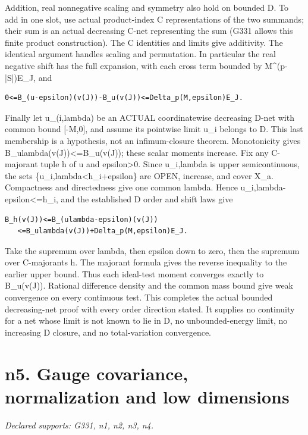 \documentclass[11pt]{article}
\begin{document}
Addition, real nonnegative scaling and symmetry also hold on bounded D. To add in one slot, use actual product-index C representations of the two summands; their sum is an actual decreasing C-net representing the sum (G331 allows this finite product construction). The C identities and limits give additivity. The identical argument handles scaling and permutation. In particular the real negative shift has the full expansion, with each cross term bounded by M\textasciicircum{}(p-|S|)E\_J, and

\begin{Verbatim}[fontsize=\small,breaklines=true,breakanywhere=true]
0<=B_(u-epsilon)(v(J))-B_u(v(J))<=Delta_p(M,epsilon)E_J.
\end{Verbatim}

Finally let u\_(i,lambda) be an ACTUAL coordinatewise decreasing D-net with common bound [-M,0], and assume its pointwise limit u\_i belongs to D. This last membership is a hypothesis, not an infimum-closure theorem. Monotonicity gives B\_ulambda(v(J))<=B\_u(v(J)); these scalar moments increase. Fix any C-majorant tuple h of u and epsilon>0. Since u\_i,lambda is upper semicontinuous, the sets \{u\_i,lambda<h\_i+epsilon\} are OPEN, increase, and cover X\_a. Compactness and directedness give one common lambda. Hence u\_i,lambda-epsilon<=h\_i, and the established D order and shift laws give

\begin{Verbatim}[fontsize=\small,breaklines=true,breakanywhere=true]
B_h(v(J))<=B_(ulambda-epsilon)(v(J))
   <=B_ulambda(v(J))+Delta_p(M,epsilon)E_J.
\end{Verbatim}

Take the supremum over lambda, then epsilon down to zero, then the supremum over C-majorants h. The majorant formula gives the reverse inequality to the earlier upper bound. Thus each ideal-test moment converges exactly to B\_u(v(J)). Rational difference density and the common mass bound give weak convergence on every continuous test. This completes the actual bounded decreasing-net proof with every order direction stated. It supplies no continuity for a net whose limit is not known to lie in D, no unbounded-energy limit, no increasing D closure, and no total-variation convergence.

\section{n5. Gauge covariance, normalization and low dimensions}
\textit{Declared supports: G331, n1, n2, n3, n4.}
\end{document}
